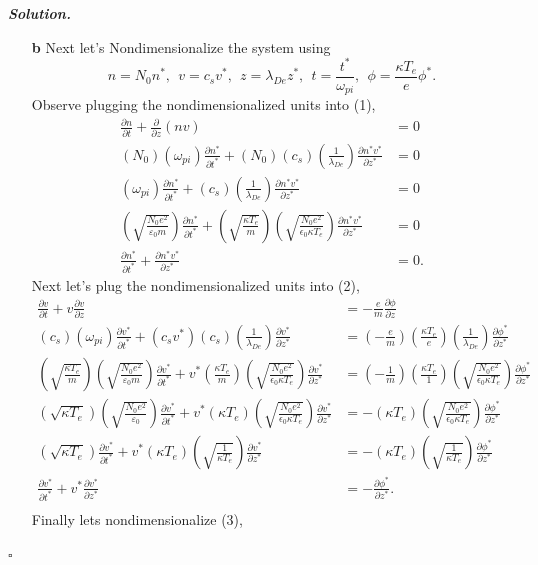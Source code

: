 \documentclass[12pt]{report}
\newenvironment{solution}[1][\it{Solution}]{\textbf{#1. } }{$\square$}
\def\eps{{\epsilon}}
\newcommand{\paren}[1]{{\left(#1\right)}} %
\newcommand{\pp}[2]{\frac{\partial #1}{\partial #2}} %
\begin{document}
\begin{solution}
\begin{enumerate}
    \item[{\bf b}]
    Next let's Nondimensionalize the system using  
    \[
    n=N_0 n^*, ~~v=c_s v^*, ~~z=\lambda_{De} z^*, ~~t=\frac{t^*}{\omega_{pi}}, ~~\phi=\frac{\kappa T_e}{e} \phi^*.
    \]
    Observe plugging the nondimensionalized units into (1),
    \begin{align*}
        \pp{n}{t} + \pp{}{z}(nv) &= 0\\
        (N_0)(\omega_{pi}) \pp{n^*}{t^*} + (N_0)(c_s)\paren{\frac{1}{\lambda_{De}}} \pp{n^*v^*}{z^*} &= 0\\
        (\omega_{pi}) \pp{n^*}{t^*} + (c_s)\paren{\frac{1}{\lambda_{De}}} \pp{n^*v^*}{z^*} &= 0\\
        \paren{\sqrt{\frac{N_0 e^2}{\varepsilon_0 m}}} \pp{n^*}{t^*} + \paren{\sqrt{\frac{\kappa T_e}{m}}}\paren{\sqrt{\frac{N_0 e^2}{\eps_0 \kappa T_e}}} \pp{n^*v^*}{z^*} &= 0\\
        \pp{n^*}{t^*} + \pp{n^*v^*}{z^*} &= 0.
    \end{align*}
    Next let's plug the nondimensionalized units into (2),
    \begin{align*}
        \pp{v}{t}+v\pp{v}{z}&=-\frac{e}{m}\pp{\phi}{z}\\
        (c_s)(\omega_{pi}) \pp{v^*}{t^*} + (c_s v^*)(c_s)\paren{\frac{1}{\lambda_{De}}} \pp{v^*}{z^*} &= \paren{-\frac{e}{m}} \paren{\frac{\kappa T_e}{e}} \paren{\frac{1}{\lambda_{De}}} \pp{\phi^*}{z^*}\\
        \paren{\sqrt{\frac{\kappa T_e}{m}}}\paren{\sqrt{\frac{N_0 e^2}{\varepsilon_0 m}}} \pp{v^*}{t^*} + v^* \paren{\frac{\kappa T_e}{m}}\paren{\sqrt{\frac{N_0 e^2}{\eps_0 \kappa T_e}}} \pp{v^*}{z^*} &= \paren{-\frac{1}{m}} \paren{\frac{\kappa T_e}{1}} \paren{\sqrt{\frac{N_0 e^2}{\eps_0 \kappa T_e}}} \pp{\phi^*}{z^*}\\
        (\sqrt{\kappa T_e})\paren{\sqrt{\frac{N_0 e^2}{\varepsilon_0}}} \pp{v^*}{t^*} + v^* \paren{\kappa T_e}\paren{\sqrt{\frac{N_0 e^2}{\eps_0 \kappa T_e}}} \pp{v^*}{z^*} &= -\paren{\kappa T_e} \paren{\sqrt{\frac{N_0 e^2}{\eps_0 \kappa T_e}}} \pp{\phi^*}{z^*}\\
        (\sqrt{\kappa T_e}) \pp{v^*}{t^*} + v^* \paren{\kappa T_e}\paren{\sqrt{\frac{1}{\kappa T_e}}} \pp{v^*}{z^*} &= -\paren{\kappa T_e} \paren{\sqrt{\frac{1}{\kappa T_e}}} \pp{\phi^*}{z^*}\\
        \pp{v^*}{t^*} + v^*  \pp{v^*}{z^*} &= - \pp{\phi^*}{z^*}.\\
    \end{align*}
    Finally lets nondimensionalize (3),

\end{enumerate}
\end{solution}
\end{document}
